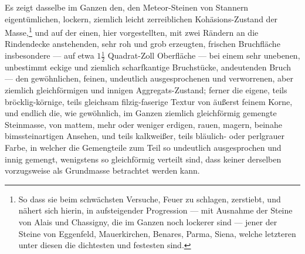 \documentclass[a4paper, 11pt, oneside, german]{article}
\begin{document}
Es zeigt dasselbe im Ganzen den, den Meteor-Steinen von Stannern eigentümlichen, lockern, ziemlich leicht zerreiblichen Kohäsions-Zustand der Masse,\footnote{So dass sie beim schwächsten Versuche, Feuer zu schlagen, zerstiebt, und nähert sich hierin, in aufsteigender Progression --- mit Ausnahme der Steine von Alais und Chassigny, die im Ganzen noch lockerer sind --- jener der Steine von Eggenfeld, Mauerkirchen, Benares, Parma, Siena, welche letzteren unter diesen die dichtesten und festesten sind.} und auf der einen, hier vorgestellten, mit zwei Rändern an die Rindendecke anstehenden, sehr roh und grob erzeugten, frischen Bruchfläche insbesondere --- auf etwa $1\frac{1}{2}$ Quadrat-Zoll Oberfläche --- bei einem sehr unebenen, unbestimmt eckige und ziemlich scharfkantige Bruchstücke, andeutenden Bruch --- den gewöhnlichen, feinen, undeutlich ausgesprochenen und verworrenen, aber ziemlich gleichförmigen und innigen Aggregats-Zustand; ferner die eigene, teils bröcklig-körnige, teils gleichsam filzig-faserige Textur von äußerst feinem Korne, und endlich die, wie gewöhnlich, im Ganzen ziemlich gleichförmig gemengte Steinmasse, von mattem, mehr oder weniger erdigen, rauen, magern, beinahe bimssteinartigen Ansehen, und teils kalkweißer, teils bläulich- oder perlgrauer Farbe, in welcher die Gemengteile zum Teil so undeutlich ausgesprochen und innig gemengt, wenigstens so gleichförmig verteilt sind, dass keiner derselben vorzugsweise als Grundmasse betrachtet werden kann.
\end{document}
